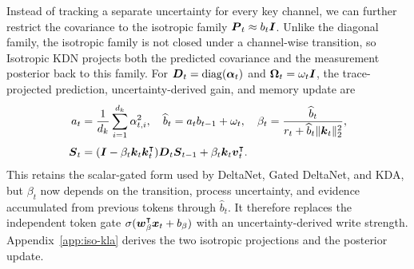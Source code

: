 \documentclass[11pt,letterpaper,logo]{yalearxiv}
\begin{document}
Instead of tracking a separate uncertainty for every key channel, we can further restrict the
covariance to the isotropic family $\boldsymbol{P}_t\approx b_t\boldsymbol{I}$. Unlike the diagonal family, the
isotropic family is not closed under a channel-wise transition, so Isotropic KDN projects both the
predicted covariance and the measurement posterior back to this family. For
$\boldsymbol{D}_t=\operatorname{diag}(\boldsymbol{\alpha}_t)$ and $\boldsymbol{\Omega}_t=\omega_t\boldsymbol{I}$, the trace-projected
prediction, uncertainty-derived gain, and memory update are
\begin{equation}
\begin{aligned}
  a_t
  &=\frac{1}{d_k}\sum_{i=1}^{d_k}\alpha_{t,i}^2,
  \quad
  \widehat b_t
  =a_t b_{t-1}+\omega_t,
  \quad
  \beta_t
  =\frac{\widehat b_t}{r_t+\widehat b_t\|\boldsymbol{k}_t\|_2^2},
  \\[3pt]
  \boldsymbol{S}_t
  &=(\boldsymbol{I}-\beta_t\boldsymbol{k}_t\boldsymbol{k}_t^{\intercal})\boldsymbol{D}_t\boldsymbol{S}_{t-1}
    +\beta_t\boldsymbol{k}_t\boldsymbol{v}_t^{\intercal}.
\end{aligned}
  \label{eq:main-iso-kdn-gain}
\end{equation}
This retains the scalar-gated form used by DeltaNet, Gated DeltaNet, and KDA, but $\beta_t$ now
depends on the transition, process uncertainty, and evidence accumulated from previous tokens
through $\widehat b_t$. It therefore replaces the independent token gate
$\sigma(\boldsymbol{w}_{\beta}^{\intercal}\boldsymbol{x}_t+b_{\beta})$ with an uncertainty-derived write strength.
Appendix~\ref{app:iso-kla} derives the two isotropic projections and the posterior update.
\end{document}
